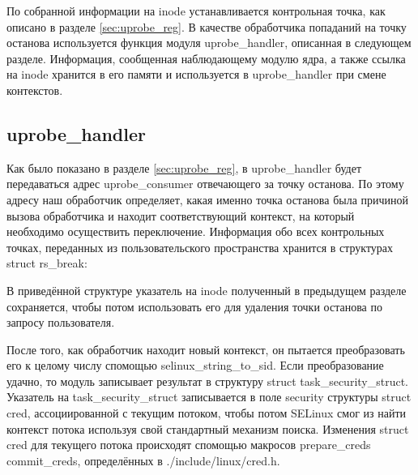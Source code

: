 
\bigskip

По собранной информации на inode устанавливается контрольная точка, как
описано в разделе \ref{sec:uprobe_reg}. В качестве обработчика попаданий
на точку останова используется функция модуля uprobe\_handler, описанная
в следующем разделе.  Информация, сообщенная наблюдающему модулю ядра, а
также ссылка на inode хранится в его памяти и используется в
uprobe\_handler при смене контекстов.

\subsection{uprobe\_handler}

Как было показано в разделе \ref{sec:uprobe_reg}, в uprobe\_handler
будет передаваться адрес uprobe\_consumer отвечающего за точку останова.
По этому адресу наш обработчик определяет, какая именно точка останова
была причиной вызова обработчика и находит соответствующий контекст, на
который необходимо осуществить переключение. Информация обо всех
контрольных точках, переданных из пользовательского пространства
хранится в структурах struct rs\_break:


\bigskip

В приведённой структуре указатель на inode полученный в предыдущем
разделе сохраняется, чтобы потом использовать его для удаления точки
останова по запросу пользователя. 

После того, как обработчик находит новый контекст, он пытается
преобразовать его к целому числу спомощью selinux\_string\_to\_sid. Если
преобразование удачно, то модуль записывает результат в структуру struct
task\_security\_struct.  Указатель на task\_security\_struct
записывается в поле security структуры struct cred, ассоциированной с
текущим потоком, чтобы потом SELinux смог из найти контекст потока
используя свой стандартный механизм поиска. Изменения struct cred для
текущего потока происходят спомощью макросов prepare\_creds
commit\_creds, определённых в ./include/linux/cred.h.

